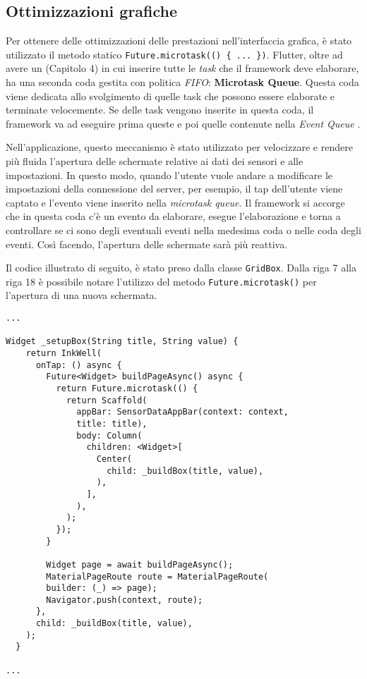 \subsection{Ottimizzazioni grafiche}

Per ottenere delle ottimizzazioni delle prestazioni nell'interfaccia grafica, è stato utilizzato il metodo statico \verb|Future.microtask(() { ... })|. Flutter, oltre ad avere un  (Capitolo 4) in cui inserire tutte le \textit{task} che il framework deve elaborare, ha una seconda coda gestita con politica \textit{FIFO}: \textbf{Microtask Queue}. Questa coda viene dedicata allo svolgimento di quelle task che possono essere elaborate e terminate velocemente. Se delle task vengono inserite in questa coda, il framework va ad eseguire prima queste e poi quelle contenute nella \textit{Event Queue} \cite{future_microtask}.

Nell'applicazione, questo meccanismo è stato utilizzato per velocizzare e rendere più fluida l'apertura delle schermate relative ai dati dei sensori e alle impostazioni. In questo modo, quando l'utente vuole andare a modificare le impostazioni della connessione del server, per esempio, il tap dell'utente viene captato e l'evento viene inserito nella \textit{microtask queue}. Il framework si accorge che in questa coda c'è un evento da elaborare, esegue l'elaborazione e torna a controllare se ci sono degli eventuali eventi nella medesima coda o nelle coda degli eventi. Così facendo, l'apertura delle schermate sarà più reattiva.

Il codice illustrato di seguito, è stato preso dalla classe \verb|GridBox|. Dalla riga 7 alla riga 18 è possibile notare l'utilizzo del metodo \verb|Future.microtask()| per l'apertura di una nuova schermata.

\newpage

\begin{lstlisting}
...

Widget _setupBox(String title, String value) {
    return InkWell(
      onTap: () async {
        Future<Widget> buildPageAsync() async {
          return Future.microtask(() {
            return Scaffold(
              appBar: SensorDataAppBar(context: context, 
              title: title),
              body: Column(
                children: <Widget>[
                  Center(
                    child: _buildBox(title, value),
                  ),
                ],
              ),
            );
          });
        }

        Widget page = await buildPageAsync();
        MaterialPageRoute route = MaterialPageRoute(
        builder: (_) => page);
        Navigator.push(context, route);
      },
      child: _buildBox(title, value),
    );
  }
  
...
\end{lstlisting}

